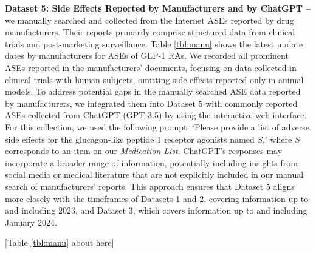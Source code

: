 \documentclass[referee,bst/sn-basic]{sn-jnl}%
\theoremstyle{thmstyletwo}%
\theoremstyle{thmstylethree}%
\begin{document}
\textbf{Dataset 5: Side Effects Reported by Manufacturers and by ChatGPT -- }
we manually searched and collected from the Internet ASEs reported by drug manufacturers. Their reports primarily comprise structured data from clinical trials and post-marketing surveillance. 
Table \ref{tbl:manu} shows the latest update dates by manufacturers for ASEs of GLP-1 RAs.
We recorded all prominent ASEs reported in the manufacturers’ documents, focusing on data collected in clinical trials with human subjects, omitting side effects reported only in animal models. 
To address potential gaps in the manually searched ASE data reported by manufacturers, we integrated them into Dataset 5 with commonly reported ASEs collected from ChatGPT (GPT-3.5) by using the interactive web interface. 
For this collection, we used the following prompt: `Please provide a list of adverse side effects for the glucagon-like peptide 1 receptor agonists named $S$,' where $S$ corresponds to an item on our \textit{Medication List}. 
ChatGPT’s responses may incorporate a broader range of information, potentially including insights from social media or medical literature that are not explicitly included in our manual search of manufacturers' reports. 
This approach ensures that Dataset 5 aligns more closely with the timeframes of Datasets 1 and 2, covering information up to and including 2023, and Dataset 3, which covers information up to and including January 2024.

\begin{center}
[Table \ref{tbl:manu} about here] 
\end{center}
\end{document}

